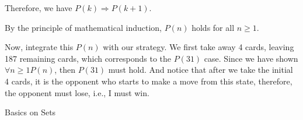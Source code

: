 \documentclass[answers]{exam}
\begin{document}
\begin{questions}
\begin{parts}
\begin{solution}
\begin{psol}
                Therefore, we have $P(k)\Rightarrow P(k+1)$.

                By the principle of mathematical induction, $P(n)$ holds for all $n\geq1$.

                Now, integrate this $P(n)$ with our strategy. We first take away 4 cards, leaving
                187 remaining cards, which corresponds to the $P(31)$ case. Since we have shown
                $\forall n\geq 1 P(n)$, then $P(31)$ must hold. And notice that after we take the
                initial 4 cards, it is the opponent who starts to make a move from this state,
                therefore, the opponent must lose, i.e., I must win.
            \end{psol}
        \end{solution}

    \end{parts}

    \question Basics on Sets

\end{questions}
\end{document}
